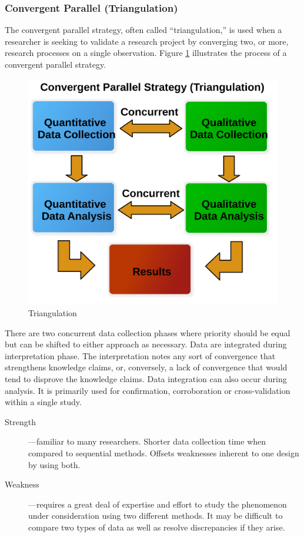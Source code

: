 \subsubsection{Convergent Parallel (Triangulation)}

The convergent parallel strategy, often called ``triangulation,'' is used when a researcher is seeking to validate a research project by converging two, or more, research processes on a single observation. Figure \ref{14:fig92} illustrates the process of a convergent parallel strategy. 

\begin{figure}[H]
	\centering
	\includegraphics[width=\maxwidth{.95\linewidth}]{gfx/14-Triangulation}
	\caption{Triangulation}
	\label{14:fig92}
\end{figure}

There are two concurrent data collection phases where priority should be equal but can be shifted to either approach as necessary. Data are integrated during interpretation phase. The interpretation notes any sort of convergence that strengthens knowledge claims, or, conversely, a lack of convergence that would tend to disprove the knowledge claims. Data integration can also occur during analysis. It is primarily used for confirmation, corroboration or cross-validation within a single study.

\begin{description}
	\item[Strength]---familiar to many researchers. Shorter data collection time when compared to sequential methods. Offsets weaknesses inherent to one design by using both.
	\item[Weakness]---requires a great deal of expertise and effort to study the phenomenon under consideration using two different methods. It may be difficult to compare two types of data as well as resolve discrepancies if they arise.
\end{description}



